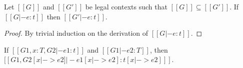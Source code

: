 \begin{comment}
\begin{lem}[Free Variable]\label{lem:appendix:free}
    If $[[G |- e:t]]$, then $\FV(e) \subseteq \dom([[G]])$ and $\FV([[t]])
\subseteq \dom([[G]])$.
\end{lem}

\begin{proof}
    By induction on the derivation of $[[G |- e:t]]$. We only treat cases
\ruleref{T\_Mu}, \ruleref{T\_CastUp} and \ruleref{T\_CastDown} (since proofs of
other cases are the same as \cc \cite{handbook}):
    \begin{description}
        \item[Case \ruleref{T\_Mu}:] From premises of $[[G |- (mu x:t.e1) :
t]]$, by the induction hypothesis, we have $\FV(e_1) \subseteq \dom([[G]]) \cup
\{[[x]]\}$ and $\FV(\tau) \subseteq \dom([[G]])$. Thus the result follows by
$\FV([[mu x:t.e1]])=\FV(e_1) \setminus \{[[x]]\} \subseteq \dom([[G]])$ and
$\FV(\tau) \subseteq \dom([[G]])$.
        \item[Case \ruleref{T\_CastUp}:] Since $\FV([[castup [t]
e1]])=\FV([[e1]])$, the result follows directly by the induction hypothesis.
        \item[Case \ruleref{T\_CastDown}:] Since $\FV([[castdown
e1]])=\FV([[e1]])$, the result follows directly by the induction hypothesis.
    \end{description}
\end{proof}
\end{comment}

\begin{lem}[Thinning]\label{lem:appendix:thin}
    Let $[[G]]$ and $[[G']]$ be legal contexts such that $[[G]] \subseteq
[[G']]$. If $[[G |- e : t]]$ then $[[G' |- e : t]]$.
\end{lem}

\begin{proof}
    By trivial induction on the derivation of $[[G |- e : t]]$.
\end{proof}

\begin{lem}[Substitution]\label{lem:appendix:subst}
	If $[[G1, x:T, G2 |- e1:t]]$ and $[[G1 |- e2:T]]$, then $[[G1, G2 [x |-> e2]
|- e1[x |-> e2]  : t[x |-> e2] ]]$.
\end{lem}

